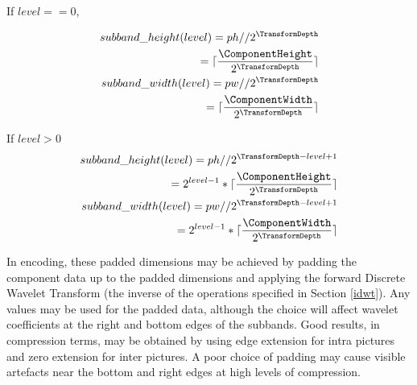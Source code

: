 If $level==0$,

\begin{eqnarray*}
subband\_height(level)=ph//2^{\TransformDepth} \\
=\lceil\frac{\ComponentHeight}{2^{\TransformDepth}}\rceil \\
subband\_width(level)=pw//2^{\TransformDepth} \\
=\lceil\frac{\ComponentWidth}{2^{\TransformDepth}}\rceil
\end{eqnarray*}

If $level>0$
\begin{eqnarray*}
subband\_height(level)=ph//2^{\TransformDepth-level+1} \\
=2^{level-1}*\lceil\frac{\ComponentHeight}{2^{\TransformDepth}}\rceil \\
subband\_width(level)=pw//2^{\TransformDepth-level+1} \\
=2^{level-1}*\lceil \frac{\ComponentWidth}{2^{\TransformDepth}}\rceil
\end{eqnarray*}

\begin{informative}
In encoding, these padded dimensions may be achieved by padding the 
component data up to the padded dimensions and applying the forward
Discrete Wavelet Transform (the inverse of the operations specified in
Section \ref{idwt}). Any values may be used for the padded data, although
the choice will affect wavelet coefficients at the right and bottom 
edges of the subbands. Good results, in compression terms, may be obtained
 by using edge extension for intra pictures and zero extension for inter 
pictures. A poor choice of padding may cause visible artefacts near the
bottom and right edges at high levels of compression.
\end{informative}

